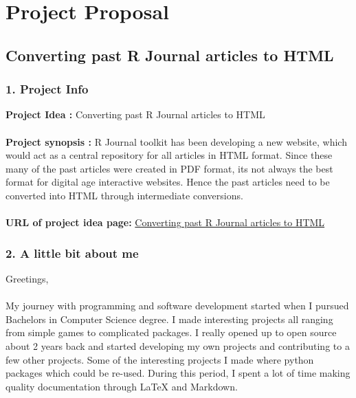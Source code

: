 \documentclass[12pt]{article}
\begin{document}


\section{Project Proposal}

\subsection{Converting past R Journal articles to HTML}

\subsubsection{1. Project Info}
{\large\bfseries Project Idea : } {Converting past R Journal articles to HTML}\\
\\
{\large\bfseries Project synopsis :} R Journal toolkit has been developing a new website, which would act as a central repository for all articles in HTML format. Since these many of the past articles were created in PDF format, its not always the best format for digital age interactive websites. Hence the past articles need to be converted into HTML through intermediate conversions. \\
\\
{\large\bfseries URL of project idea page:} \href{https://github.com/rstats-gsoc/gsoc2022/wiki/Converting-past-R-Journal-articles-to-HTML}{\color{orange}Converting past R Journal articles to HTML}
\subsubsection{2. A little bit about me}
 {\large Greetings},\\
 \\
\hspace*{3mm}My journey with programming and software development started when I pursued Bachelors in Computer Science degree. I made interesting projects all ranging from simple games to complicated packages.
I really opened up to open source about 2 years back and started developing my own projects and contributing to a few other projects. Some of the interesting projects I made where python packages which could be re-used. During this period, I spent a lot of time making quality documentation through LaTeX and Markdown. 
 
\end{document}

